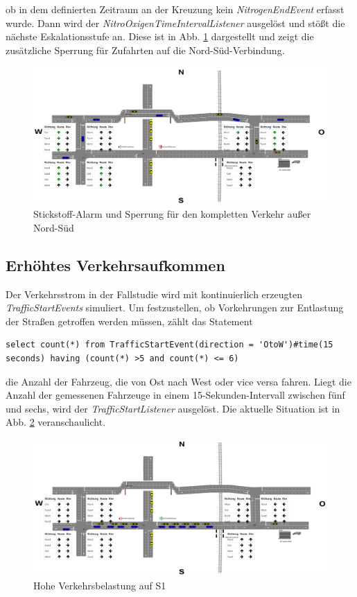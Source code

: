 ob in dem definierten Zeitraum an der Kreuzung kein \textit{NitrogenEndEvent} erfasst wurde. Dann wird der \textit{NitroOxigenTimeIntervalListener} ausgelöst und stößt die nächste Eskalationsstufe an. Diese ist in Abb. \ref{fig9} dargestellt und zeigt die zusätzliche Sperrung für Zufahrten auf die Nord-Süd-Verbindung.

\begin{figure}[ht]
	\includegraphics[width=\textwidth]{images/NitroOxigenStillHigh.png}
	\caption{Stickstoff-Alarm und Sperrung für den kompletten Verkehr außer Nord-Süd}
	\label{fig9}
\end{figure}


\subsection{Erhöhtes Verkehrsaufkommen}

Der Verkehrsstrom in der Fallstudie wird mit kontinuierlich erzeugten \textit{TrafficStartEvents} simuliert. Um festzustellen, ob  Vorkehrungen zur Entlastung der Straßen getroffen werden müssen, zählt das Statement

\begin{lstlisting}
select count(*) from TrafficStartEvent(direction = 'OtoW')#time(15 seconds) having (count(*) >5 and count(*) <= 6)
\end{lstlisting}

die Anzahl der Fahrzeug, die von Ost nach West oder vice versa fahren. Liegt die Anzahl der gemessenen Fahrzeuge in einem 15-Sekunden-Intervall zwischen fünf und sechs, wird der \textit{TrafficStartListener} ausgelöst. Die aktuelle Situation ist in Abb. \ref{fig10} veranschaulicht.

\begin{figure}[ht]
	\includegraphics[width=\textwidth]{images/TrafficHigh.png}
	\caption{Hohe Verkehrsbelastung auf S1}
	\label{fig10}
\end{figure}


